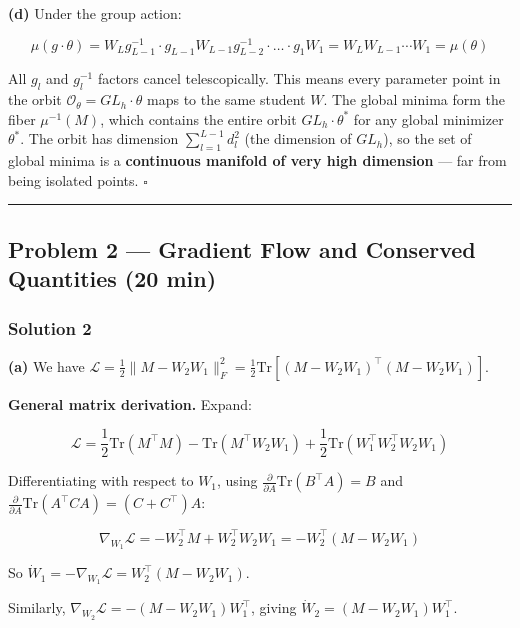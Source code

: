 \documentclass[
]{article}
\begin{document}
\textbf{(d)} Under the group action:

\[\mu(g \cdot \theta) = W_L g_{L-1}^{-1} \cdot g_{L-1} W_{L-1} g_{L-2}^{-1} \cdot \ldots \cdot g_1 W_1 = W_L W_{L-1} \cdots W_1 = \mu(\theta)\]

All \(g_l\) and \(g_l^{-1}\) factors cancel telescopically. This means
every parameter point in the orbit
\(\mathcal{O}_\theta = GL_h \cdot \theta\) maps to the same student
\(W\). The global minima form the fiber \(\mu^{-1}(M)\), which contains
the entire orbit \(GL_h \cdot \theta^*\) for any global minimizer
\(\theta^*\). The orbit has dimension \(\sum_{l=1}^{L-1} d_l^2\) (the
dimension of \(GL_h\)), so the set of global minima is a
\textbf{continuous manifold of very high dimension} --- far from being
isolated points. \(\square\)

\begin{center}\rule{0.5\linewidth}{0.5pt}\end{center}

\subsection{Problem 2 --- Gradient Flow and Conserved Quantities (20
min)}\label{problem-2-gradient-flow-and-conserved-quantities-20-min}

\subsubsection{Solution 2}\label{solution-2}

\textbf{(a)} We have
\(\mathcal{L} = \frac{1}{2}\|M - W_2 W_1\|_F^2 = \frac{1}{2}\text{Tr}\left[(M - W_2 W_1)^\top(M - W_2 W_1)\right]\).

\textbf{General matrix derivation.} Expand:

\[\mathcal{L} = \frac{1}{2}\text{Tr}(M^\top M) - \text{Tr}(M^\top W_2 W_1) + \frac{1}{2}\text{Tr}(W_1^\top W_2^\top W_2 W_1)\]

Differentiating with respect to \(W_1\), using
\(\frac{\partial}{\partial A}\text{Tr}(B^\top A) = B\) and
\(\frac{\partial}{\partial A}\text{Tr}(A^\top C A) = (C + C^\top)A\):

\[\nabla_{W_1}\mathcal{L} = -W_2^\top M + W_2^\top W_2 W_1 = -W_2^\top(M - W_2 W_1)\]

So \(\dot{W}_1 = -\nabla_{W_1}\mathcal{L} = W_2^\top(M - W_2 W_1)\).

Similarly, \(\nabla_{W_2}\mathcal{L} = -(M - W_2 W_1)W_1^\top\), giving
\(\dot{W}_2 = (M - W_2 W_1)W_1^\top\).
\end{document}
